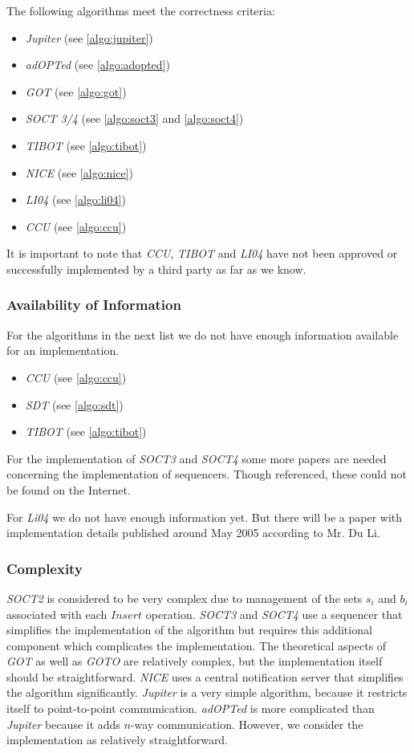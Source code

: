 The following algorithms meet the correctness criteria:
\begin{itemize}
 \item \emph{Jupiter} (see \ref{algo:jupiter})
 \item \emph{adOPTed} (see \ref{algo:adopted})
 \item \emph{GOT} (see \ref{algo:got})
 \item \emph{SOCT 3/4} (see \ref{algo:soct3} and \ref{algo:soct4})
 \item \emph{TIBOT} (see \ref{algo:tibot})
 \item \emph{NICE} (see \ref{algo:nice})
 \item \emph{LI04} (see \ref{algo:li04})
 \item \emph{CCU} (see \ref{algo:ccu})
\end{itemize}

It is important to note that \emph{CCU}, \emph{TIBOT} and \emph{LI04} have not been approved or successfully implemented by a third party as far as we know.


\subsubsection{Availability of Information}
For the algorithms in the next list we do not have enough information available for an implementation.

\begin{itemize}
 \item \emph{CCU} (see \ref{algo:ccu})
 \item \emph{SDT} (see \ref{algo:sdt})
 \item \emph{TIBOT} (see \ref{algo:tibot})
\end{itemize}

For the implementation of \emph{SOCT3} and \emph{SOCT4} some more papers are needed concerning the implementation of sequencers. Though referenced, these could not be found on the Internet. 

For \emph{Li04} we do not have enough information yet. But there will be a paper with implementation details published around May 2005 according to Mr. Du Li.


\subsubsection{Complexity}
\emph{SOCT2} is considered to be very complex \cite{imine03b} \cite{sdt} due to management of the sets $s_i$ and $b_i$ associated with each $Insert$ operation. \emph{SOCT3} and \emph{SOCT4} use a sequencer that simplifies the implementation of the algorithm but requires this additional component which complicates the implementation. The theoretical aspects of \emph{GOT} as well as \emph{GOTO} are relatively complex, but the implementation itself should be straightforward. \emph{NICE} uses a central notification server that simplifies the algorithm significantly. \emph{Jupiter} is a very simple algorithm, because it restricts itself to point-to-point communication. \emph{adOPTed} is more complicated than \emph{Jupiter} because it adds $n$-way communication. However, we consider the implementation as relatively straightforward.  


